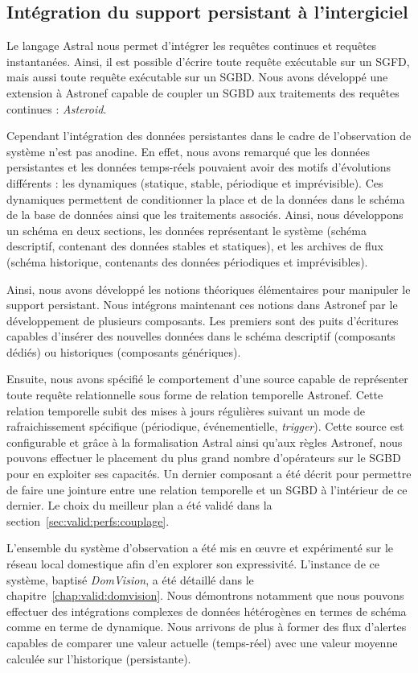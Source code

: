 \subsection{Intégration du support persistant à l'intergiciel}
Le langage Astral nous permet d'intégrer les requêtes continues et requêtes instantanées. Ainsi, il est possible d'écrire toute requête exécutable sur un SGFD, mais aussi toute requête exécutable sur un SGBD. Nous avons développé une extension à Astronef capable de coupler un SGBD aux traitements des requêtes continues : \textit{Asteroid}.

Cependant l'intégration des données persistantes dans le cadre de l'observation de système n'est pas anodine. En effet, nous avons remarqué que les données persistantes et les données temps-réels pouvaient avoir des motifs d'évolutions différents : les dynamiques (statique, stable, périodique et imprévisible). Ces dynamiques permettent de conditionner la place et de la données dans le schéma de la base de données ainsi que les traitements associés. Ainsi, nous développons un schéma en deux sections, les données représentant le système (schéma descriptif, contenant des données stables et statiques), et les archives de flux (schéma historique, contenants des données périodiques et imprévisibles).

Ainsi, nous avons développé les notions théoriques élémentaires pour manipuler le support persistant. Nous intégrons maintenant ces notions dans Astronef par le développement de plusieurs composants. Les premiers sont des puits d'écritures capables d'insérer des nouvelles données dans le schéma descriptif (composants dédiés) ou historiques (composants génériques).

Ensuite, nous avons spécifié le comportement d'une source capable de représenter toute requête relationnelle sous forme de relation temporelle Astronef. Cette relation temporelle subit des mises à jours régulières suivant un mode de rafraichissement spécifique (périodique, événementielle, \textit{trigger}). Cette source est configurable et grâce à la formalisation Astral ainsi qu'aux règles Astronef, nous pouvons effectuer le placement du plus grand nombre d'opérateurs sur le SGBD pour en exploiter ses capacités. Un dernier composant a été décrit pour permettre de faire une jointure entre une relation temporelle et un SGBD à l'intérieur de ce dernier. Le choix du meilleur plan a été validé dans la section~\ref{sec:valid:perfs:couplage}.

L'ensemble du système d'observation a été mis en œuvre et expérimenté sur le réseau local domestique afin d'en explorer son expressivité. L'instance de ce système, baptisé \textit{DomVision}, a été détaillé dans le chapitre~\ref{chap:valid:domvision}. Nous démontrons notamment que nous pouvons effectuer des intégrations complexes de données hétérogènes en termes de schéma comme en terme de dynamique. Nous arrivons de plus à former des flux d'alertes capables de comparer une valeur actuelle (temps-réel) avec une valeur moyenne calculée sur l'historique (persistante).